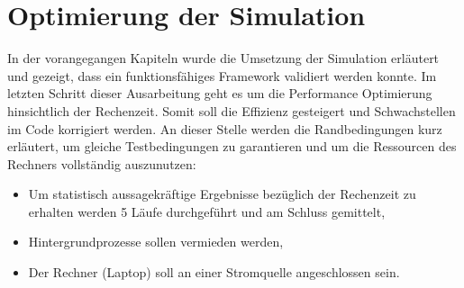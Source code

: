 \chapter{Optimierung der Simulation}
\label{ch:opt}
In der vorangegangen Kapiteln wurde die Umsetzung der Simulation erläutert und gezeigt, dass ein funktionsfähiges Framework validiert werden konnte. Im letzten Schritt dieser Ausarbeitung geht es um die Performance Optimierung hinsichtlich der Rechenzeit. Somit soll die Effizienz gesteigert und Schwachstellen im Code korrigiert werden. An dieser Stelle werden die Randbedingungen kurz erläutert, um gleiche Testbedingungen zu garantieren und um die Ressourcen des Rechners vollständig auszunutzen:
\begin{itemize}
	\item Um statistisch aussagekräftige Ergebnisse bezüglich der Rechenzeit zu erhalten werden 5 Läufe durchgeführt und am Schluss gemittelt,
	\item Hintergrundprozesse sollen vermieden werden,
	\item Der Rechner (Laptop) soll an einer Stromquelle angeschlossen sein. 
\end{itemize}
